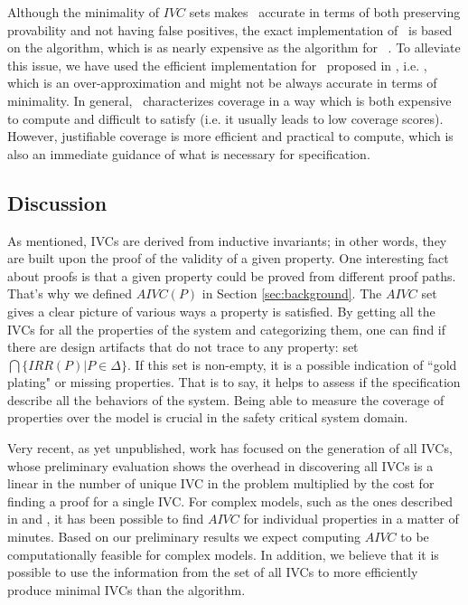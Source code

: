 Although the minimality of $IVC$ sets makes \ivccov\ accurate
in terms of both preserving provability and not having false positives, the exact implementation of \ivccov\ is based on the \ucbfalg algorithm, which is as nearly expensive as the \mustalg algorithm for \nondetcov\ . To alleviate this issue, we have used the efficient implementation for \ivccov\ proposed in \cite{Ghass16}, i.e. \ucalg,
 which is an over-approximation and might not be always accurate in terms of minimality. In general, \nondetcov\ characterizes coverage in a way which is both expensive to compute and difficult to satisfy (i.e. it usually leads to low coverage scores). However, justifiable coverage is more efficient and practical to compute, which is also an immediate guidance of what is necessary for specification.

\subsection{Discussion}
As mentioned, IVCs are derived from inductive invariants; in other words, they are built upon the proof of the validity of a given property. One interesting fact about proofs
  is that a given property could be proved from different proof paths. That's why we defined $AIVC(P)$ in Section \ref{sec:background}. The $AIVC$ set gives a clear picture of various ways a property is satisfied. By getting all the IVCs for all the properties of the system and categorizing them, one can find if there are design artifacts that do not trace to any property: set $\bigcap \{IRR (P) | P \in \Delta \}$.  If this set is non-empty, it is a possible indication of ``gold plating" or missing properties. That is to say, it helps to assess if the specification describe all the behaviors of the system. Being able to measure the coverage of properties over the model is crucial in the safety critical system domain.

Very recent, as yet unpublished, work has focused on the
generation of all IVCs, whose preliminary evaluation
shows the overhead in discovering all IVCs is a linear in the
number of unique IVC in the problem multiplied by the cost
for finding a proof for a single IVC. For complex models, such
as the ones described in \cite {QFCS15:backes} and \cite{hilt2013}, it has been possible to
find $AIVC$ for individual properties in a matter of minutes.
Based on our preliminary results we expect computing $AIVC$ to be computationally feasible for complex models. In
addition, we believe that it is possible to use the information
from the set of all IVCs to more efficiently produce minimal
IVCs than the \ucbfalg algorithm. 